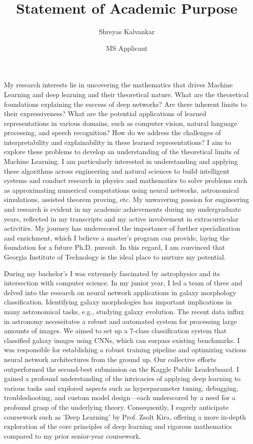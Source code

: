 \documentclass{article}
\title{Statement of Academic Purpose}
\author{Shreyas Kalvankar}
\date{MS Applicant}
\begin{document}
  \maketitle%
  \thispagestyle{empty}

\vspace{5pt} 
\hspace{0.25in}My research interests lie in uncovering the
mathematics that drives Machine Learning and deep learning and their theoretical
nature. What are the theoretical foundations explaining the success of deep
networks? Are there inherent limits to their expressiveness? What are the
potential applications of learned representations in various domains, such as
computer vision, natural language processing, and speech recognition? How do we
address the challenges of interpretability and explainability in these learned
representations? I aim to explore these problems to develop an understanding of
the theoretical limits of Machine Learning. I am particularly interested in
understanding and applying these algorithms across engineering and natural
sciences to build intelligent systems and conduct research in physics and
mathematics to solve problems such as approximating numerical computations using
neural networks, astronomical simulations, assisted theorem proving, etc. My
unwavering passion for engineering and research is evident in my academic
achievements during my undergraduate years, reflected in my transcripts and my
active involvement in extracurricular activities. My journey has underscored the
importance of further specialization and enrichment, which I believe a master's
program can provide, laying the foundation for a future Ph.D. pursuit. In this
regard, I am convinced that Georgia Institute of Technology is the ideal place
to nurture my potential.

\vspace{5pt} 
\hspace{0.25in}During my bachelor’s I was extremely fascinated by astrophysics
and its intersection with computer science. In my junior year, I led a team of
three and delved into the research on neural network applications in galaxy
morphology classification. Identifying galaxy morphologies has important
implications in many astronomical tasks, e.g., studying galaxy evolution. The
recent data influx in astronomy necessitates a robust and automated system for
processing large amounts of images. We aimed to set up a 7-class classification
system that classified galaxy images using CNNs, which can surpass existing
benchmarks. I was responsible for establishing a robust training pipeline and
optimizing various neural network architectures from the ground up. Our
collective efforts outperformed the second-best submission on the Kaggle Public
Leaderboard. I gained a profound understanding of the intricacies of applying
deep learning to various tasks and explored aspects such as hyperparameter
tuning, debugging, troubleshooting, and custom model design—each underscored by
a need for a profound grasp of the underlying theory. Consequently, I eagerly
anticipate coursework such as 'Deep Learning' by Prof. Zsolt Kira, offering a
more in-depth exploration of the core principles of deep learning and rigorous
mathematics compared to my prior senior-year coursework. 
\end{document}
